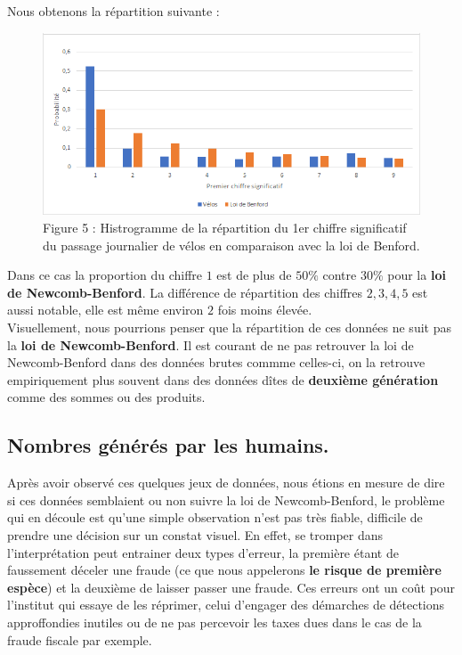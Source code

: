 \documentclass[
  12pt,
]{article}
\begin{document}
Nous obtenons la répartition suivante :

\begin{figure}
\centering
\includegraphics{Images/histogramme_velos.png}
\caption{Figure 5 : Histrogramme de la répartition du 1er chiffre
significatif du passage journalier de vélos en comparaison avec la loi
de Benford.}
\end{figure}

Dans ce cas la proportion du chiffre \(1\) est de plus de \(50 \%\)
contre \(30 \%\) pour la \textbf{loi de Newcomb-Benford}. La différence
de répartition des chiffres \(2, 3, 4, 5\) est aussi notable, elle est
même environ \(2\) fois moins élevée.\\
Visuellement, nous pourrions penser que la répartition de ces données ne
suit pas la \textbf{loi de Newcomb-Benford}. Il est courant de ne pas
retrouver la loi de Newcomb-Benford dans des données brutes commme
celles-ci, on la retrouve empiriquement plus souvent dans des données
dîtes de \textbf{deuxième génération} comme des sommes ou des produits.

\hypertarget{nombres-guxe9nuxe9ruxe9s-par-les-humains.}{%
\subsection{Nombres générés par les
humains.}\label{nombres-guxe9nuxe9ruxe9s-par-les-humains.}}

Après avoir observé ces quelques jeux de données, nous étions en mesure
de dire si ces données semblaient ou non suivre la loi de
Newcomb-Benford, le problème qui en découle est qu'une simple
observation n'est pas très fiable, difficile de prendre une décision sur
un constat visuel. En effet, se tromper dans l'interprétation peut
entrainer deux types d'erreur, la première étant de faussement déceler
une fraude (ce que nous appelerons \textbf{le risque de première
espèce}) et la deuxième de laisser passer une fraude. Ces erreurs ont un
coût pour l'institut qui essaye de les réprimer, celui d'engager des
démarches de détections approffondies inutiles ou de ne pas percevoir
les taxes dues dans le cas de la fraude fiscale par exemple.
\end{document}
